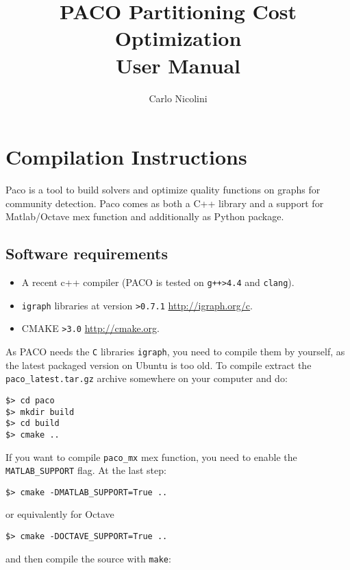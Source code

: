 \documentclass[11pt,%
              a4paper,%
]{article}
\title{PACO Partitioning Cost Optimization\\User Manual}
\author{Carlo Nicolini}
\begin{document}
\maketitle
\tableofcontents

\section{Compilation Instructions}

Paco is a tool to build solvers and optimize quality functions on graphs
for community detection. Paco comes as both a C++ library and a support
for Matlab/Octave mex function and additionally as Python package.


\subsection{Software requirements}
\begin{itemize}
\item A recent c++ compiler (PACO is tested on \texttt{g++>4.4} and \texttt{clang}).
 \item \texttt{igraph} libraries at version \texttt{>0.7.1} \url{http://igraph.org/c}.
\item CMAKE \texttt{>3.0} \url{http://cmake.org}.
\end{itemize}

As PACO needs the \texttt{C} libraries \texttt{igraph}, you need to compile them by yourself, as the latest packaged version on Ubuntu is too old.
To compile extract the \texttt{paco\_latest.tar.gz} archive somewhere on your computer and do:

\begin{verbatim}
$> cd paco
$> mkdir build
$> cd build
$> cmake ..
\end{verbatim}

If you want to compile \texttt{paco\_mx} mex function, you need to
enable the \texttt{MATLAB\_SUPPORT} flag. At the last step:

\begin{verbatim}
$> cmake -DMATLAB_SUPPORT=True ..
\end{verbatim}

or equivalently for Octave

\begin{verbatim}
$> cmake -DOCTAVE_SUPPORT=True ..
\end{verbatim}

and then compile the source with \texttt{make}:
\end{document}

